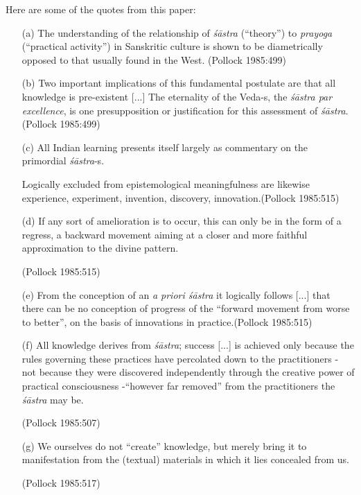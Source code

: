 Here are some of the quotes from this paper:
\begin{itemize}
\itemsep=1pt
\item[(a)] The understanding of the relationship of {\sl śāstra} (``theory'') to {\sl prayoga} (``practical activity'') in Sanskritic culture is shown to be diametrically opposed to that usually found in the West. (Pollock 1985:499)

\item[(b)] Two important implications of this fundamental postulate are that all knowledge is pre-existent [...] The eternality of the Veda-s, the {\sl śāstra par excellence}, is one presupposition or justification for this assessment of {\sl śāstra}.\hfill (Pollock 1985:499)

\item[(c)] All Indian learning presents itself largely as commentary on the primordial {\sl śāstra}-s.

Logically excluded from epistemological meaningfulness are likewise experience, experiment, invention, discovery, innovation.\hfill (Pollock 1985:515)

\item[(d)] If any sort of amelioration is to occur, this can only be in the form of a regress, a backward movement aiming at a closer and more faithful approximation to the divine pattern.

\hfill (Pollock 1985:515)

\item[(e)] From the conception of an {\sl a priori śāstra} it logically follows [...] that there can be no conception of progress of the ``forward movement from worse to better'', on the basis of innovations in practice.\hfill (Pollock 1985:515)

\item[(f)] All knowledge derives from {\sl śāstra}; success [...] is achieved only because the rules governing these practices have percolated down to the practitioners - not because they were discovered independently through the creative power of practical consciousness -``however far removed'' from the practitioners the {\sl śāstra} may be.

\hfill (Pollock 1985:507)

\item[(g)] We ourselves do not ``create'' knowledge, but merely bring it to manifestation from the (textual) materials in which it lies concealed from us.

\hfill (Pollock 1985:517) 
\end{itemize}

